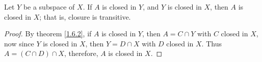 \begin{theorem}\label{1.6.3}
    Let $Y$ be a subspace of  $X$. If  $A$ is closed in  $Y$, and  $Y$ is closed
    in  $X$, then  $A$ is closed in  $X$; that is, closure is transitive.
\end{theorem}
\begin{proof}
    By theorem \ref{1.6.2}, if $A$ is closed in  $Y$, then  $A=C \cap Y$ with
    $C$ closed in  $X$, now since  $Y$ is closed in  $X$, then  $Y=D \cap X$
    with  $D$ closed in  $X$. Thus  $A=(C \cap D) \cap X$, therefore,  $A$ is
    closed in  $X$.		
\end{proof}

